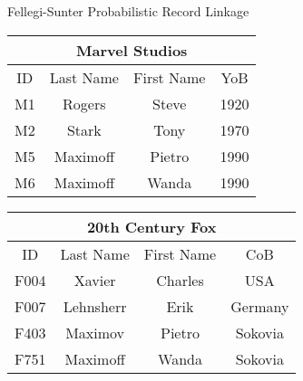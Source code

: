 
\begin{frame}{\Large Fellegi-Sunter Probabilistic Record Linkage}

\vskip 0.5cm

\tiny
\begin{multicols}{2}
	\begin{flushleft}
	\begin{tabular}{|c|c|c||c|}
	\hline
		\multicolumn{4}{|c|}{Marvel Studios} \\
	\hline
		ID & Last Name & First Name & YoB \\
	\hline
		\rowcolor{bgOrange}
		M1 & Rogers & Steve & 1920 \\
	\hline
		\rowcolor{bgOrange}
		M2 & Stark & Tony & 1970 \\
	\hline
		\rowcolor{bgOrange}
		M5 & Maximo{\color{red}ff} & Pietro & 1990 \\
	\hline
		\rowcolor{bgOrange}
		M6 & Maximo{\color{red}ff} & Wanda & 1990 \\
	\hline
	\end{tabular}
	\end{flushleft}
\columnbreak
	\begin{flushright}
	\begin{tabular}{|c|c|c||c|}
	\hline
		\multicolumn{4}{|c|}{20th Century Fox} \\
	\hline
		ID & Last Name & First Name & CoB \\
	\hline
		\rowcolor{lightTurquoise}
		F004 & Xavier & Charles & USA \\
	\hline
		\rowcolor{lightTurquoise}
		F007 & Lehnsherr & Erik & Germany \\
	\hline
		\rowcolor{lightTurquoise}
		F403 & Maximo{\color{red}v} & Pietro & Sokovia \\
	\hline
		\rowcolor{lightTurquoise}
		F751 & Maximo{\color{red}ff} & Wanda & Sokovia \\
	\hline
	\end{tabular}
	\end{flushright}
\end{multicols}

\vskip -0.5cm
\mbox{}

\pause

\tiny


\end{frame}
